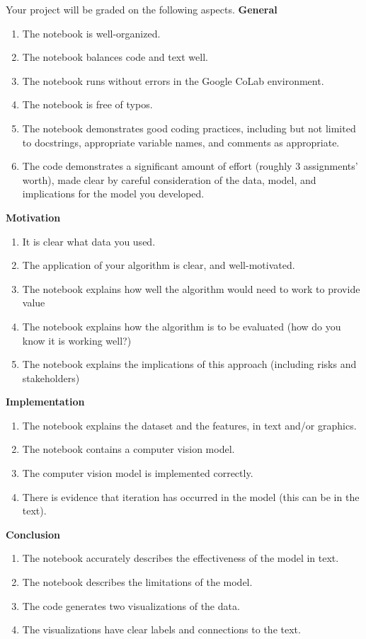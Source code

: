 \documentclass{tufte-handout}
\begin{document}
Your project will be graded on the following aspects. %
\vspace{1em}
\textbf{General}
\begin{enumerate}[leftmargin=.5in]
\item The notebook is well-organized.
\item The notebook balances code and text well.
\item The notebook runs without errors in the Google CoLab environment.
\item The notebook is free of typos.
\item The notebook demonstrates good coding practices, including but not limited to docstrings, appropriate variable names, and comments as appropriate.
\item The code demonstrates a significant amount of effort (roughly 3 assignments'
  worth), made clear by careful consideration of the data, model, and implications for the model you developed.
\end{enumerate}

\textbf{Motivation}
\begin{enumerate}[resume, leftmargin=.5in]
\item It is clear what data you used.
\item The application of your algorithm is clear, and well-motivated.
\item The notebook explains how well the algorithm would need to work to provide value
\item The notebook explains how the algorithm is to be evaluated (how do you know it is working well?)
\item The notebook explains the implications of this approach (including risks and stakeholders)
\end{enumerate}

\textbf{Implementation}
\begin{enumerate}[resume, leftmargin=.5in]
\item The notebook explains the dataset and the features, in text and/or graphics.
\item The notebook contains a computer vision model.
\item The computer vision model is implemented correctly.
\item There is evidence that iteration has occurred in the model (this can be in the text).
\end{enumerate}

\textbf{Conclusion}
\begin{enumerate}[resume, leftmargin=.5in]
\item The notebook accurately describes the effectiveness of the model in text.
\item The notebook describes the limitations of the model.
\item The code generates two visualizations of the data.
\item The visualizations have clear labels and connections to the text.
\end{enumerate}
\end{document}
